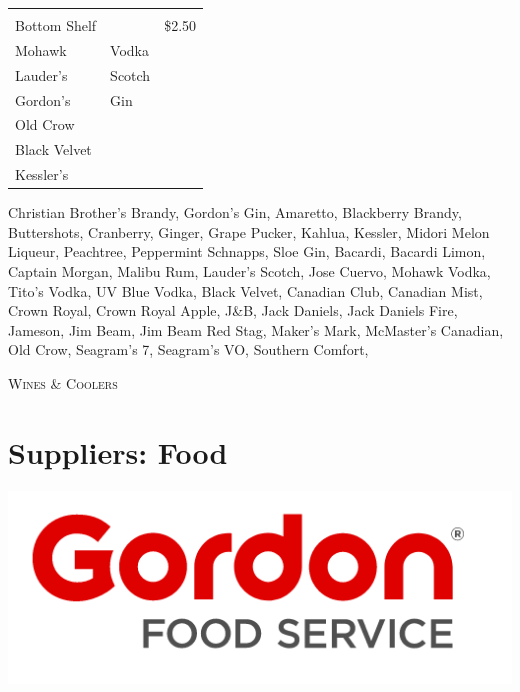 \documentclass[a0,landscape]{a0poster}
\begin{document}
\begin{multicols}{4}
\begin{center}
\begin{tabular}{ l l r }
& & \\
Bottom Shelf & &\$2.50 \\
\hline
Mohawk & Vodka & \\
Lauder's & Scotch & \\
Gordon's & Gin & \\
Old Crow & & \\
Black Velvet & & \\
Kessler's & & \\

\hline
\end{tabular}
\end{center}

Christian Brother's Brandy, Gordon's Gin, Amaretto, Blackberry Brandy, Buttershots, Cranberry, Ginger, Grape Pucker, Kahlua, Kessler, Midori Melon Liqueur, Peachtree, Peppermint Schnapps, Sloe Gin, Bacardi, Bacardi Limon, Captain Morgan, Malibu Rum, Lauder's Scotch, Jose Cuervo, Mohawk Vodka, Tito's Vodka, UV Blue Vodka, Black Velvet, Canadian Club, Canadian Mist, Crown Royal, Crown Royal Apple, J\&B, Jack Daniels, Jack Daniels Fire, Jameson, Jim Beam, Jim Beam Red Stag, Maker's Mark, McMaster's Canadian, Old Crow, Seagram's 7, Seagram’s VO, Southern Comfort,

\vspace{1cm}

\textsc{Wines \& Coolers}



\color{DarkGreen}
\section*{Suppliers: Food}
\begin{center}

\includegraphics[width=0.8\linewidth]{images/gfs}
\end{center}


\end{multicols}
\end{document}
